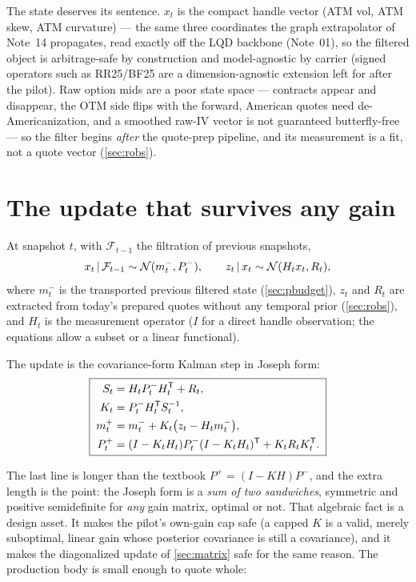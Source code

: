 \documentclass[11pt]{article}
\begin{document}
The state deserves its sentence.  $x_t$ is the compact handle vector
(ATM vol, ATM skew, ATM curvature) --- the same three coordinates the
graph extrapolator of Note~14 propagates, read exactly off the LQD
backbone (Note~01), so the filtered object is arbitrage-safe by
construction and model-agnostic by carrier (signed operators such as
RR25/BF25 are a dimension-agnostic extension left for after the pilot).
Raw option mids are a poor state space --- contracts appear and
disappear, the OTM side flips with the forward, American quotes need
de-Americanization, and a smoothed raw-IV vector is not guaranteed
butterfly-free --- so the filter begins \emph{after} the quote-prep
pipeline, and its measurement is a fit, not a quote vector
(\cref{sec:robs}).

\section{The update that survives any gain}
\label{sec:update}

\begin{definition}
\label{def:laws}
At snapshot $t$, with $\mathcal F_{t-1}$ the filtration of previous
snapshots,
\[
x_t\,|\,\mathcal F_{t-1}\sim\mathcal N(m_t^-,P_t^-),
\qquad
z_t\,|\, x_t\sim\mathcal N(H_t x_t,R_t),
\]
where $m_t^-$ is the transported previous filtered state
(\cref{sec:pbudget}), $z_t$ and $R_t$ are extracted from today's prepared
quotes without any temporal prior (\cref{sec:robs}), and $H_t$ is the
measurement operator ($I$ for a direct handle observation; the equations
allow a subset or a linear functional).
\end{definition}

The update is the covariance-form Kalman step in Joseph form:
\begin{equation}
\boxed{\;
\begin{aligned}
S_t&=H_tP_t^-H_t^{\mathsf{T}}+R_t,\\
K_t&=P_t^-H_t^{\mathsf{T}} S_t^{-1},\\
m_t^+&=m_t^-+K_t\big(z_t-H_tm_t^-\big),\\
P_t^+&=(I-K_tH_t)P_t^-(I-K_tH_t)^{\mathsf{T}}+K_tR_tK_t^{\mathsf{T}} .
\end{aligned}
\;}
\label{eq:kalman}
\end{equation}

The last line is longer than the textbook $P^+=(I-KH)P^-$, and the extra
length is the point: the Joseph form is a \emph{sum of two sandwiches},
symmetric and positive semidefinite for \emph{any} gain matrix, optimal
or not.  That algebraic fact is a design asset.  It makes the pilot's
own-gain cap safe (a capped $K$ is a valid, merely suboptimal, linear
gain whose posterior covariance is still a covariance), and it makes the
diagonalized update of \cref{sec:matrix} safe for the same reason.  The
production body is small enough to quote whole:
\end{document}
